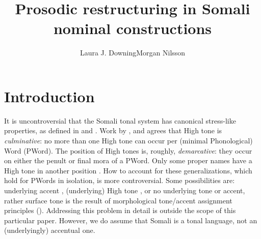\documentclass[output=paper]{langscibook}
\author{Laura J. Downing\lastand Morgan Nilsson\affiliation{University of Gothenburg, Sweden}}
\title{Prosodic restructuring in Somali nominal constructions}
\begin{document}
 
\maketitle


\section{Introduction}
\label{sec:downing:1}
It is uncontroversial that the Somali tonal system has canonical stress-like properties, as defined in \cite{Downing2010} and \citet{Hyman2006,Hyman2011,Hyman2012,Hyman2014}. Work by \citet{Hyman1981,Hyman2006,Hyman2012,LeGac2003,Green2016}, and \citet{Saeed2004} agrees that High tone is \textit{culminative}: no more than one High tone can occur per (minimal Phonological) Word (PWord). The position of High tones is, roughly, \textit{demarcative}: they occur on either the penult or final mora of a PWord. Only some proper names have a High tone in another position \citep[22]{Saeed1999}. How to account for these generalizations, which hold for PWords in isolation, is more controversial. Some possibilities are: underlying accent \citep{Banti1988,Green2016,LeGac2003}, (underlying) High tone \citep{Andrzejewski1964,Andrzejewski1979,Andrzejewski1981,Armstrong1934,Hyman2006,Hyman2014,LeGac2016}, or no underlying tone or accent, rather surface tone is the result of morphological tone\slash accent assignment principles (\citealt{Hyman1981,Mous2009}). Addressing this problem in detail is outside the scope of this particular paper. However, we do assume that Somali is a tonal language, not an (underlyingly) accentual one.
\end{document}
